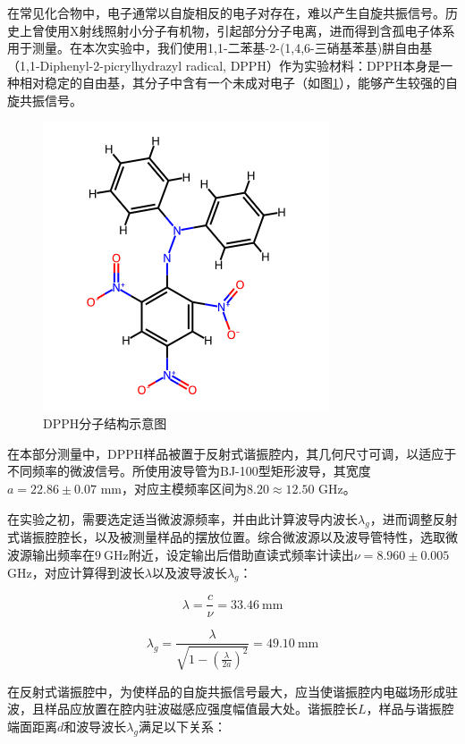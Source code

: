 \documentclass{thuemp}
\begin{document}
    在常见化合物中，电子通常以自旋相反的电子对存在，难以产生自旋共振信号。历史上曾使用X射线照射小分子有机物，引起部分分子电离，进而得到含孤电子体系用于测量。在本次实验中，我们使用1,1-二苯基-2-(1,4,6-三硝基苯基)肼自由基（1,1-Diphenyl-2-picrylhydrazyl radical, DPPH）作为实验材料：DPPH本身是一种相对稳定的自由基，其分子中含有一个未成对电子（如图\ref{fig:DPPH}），能够产生较强的自旋共振信号。\
    
    \begin{figure}[H]
        \centering
        \includegraphics[width=0.5\linewidth]{./DPPH_molecule.png}
        \caption{DPPH分子结构示意图} \label{fig:DPPH}
    \end{figure}
    
    在本部分测量中，DPPH样品被置于反射式谐振腔内，其几何尺寸可调，以适应于不同频率的微波信号。所使用波导管为BJ-100型矩形波导，其宽度$a=22.86\pm0.07$ \si{\milli\meter}，对应主模频率区间为$8.20 \approx 12.50$ \si{\giga\hertz}。
    
    在实验之初，需要选定适当微波源频率，并由此计算波导内波长$\lambda_g$，进而调整反射式谐振腔腔长，以及被测量样品的摆放位置。综合微波源以及波导管特性，选取微波源输出频率在$9~\text{GHz}$附近，设定输出后借助直读式频率计读出$\nu  = 8.960 \pm 0.005$ \si{\giga\hertz}，对应计算得到波长$\lambda$以及波导波长$\lambda_g$：
    
    \begin{equation}
    \lambda = \frac{c}{\nu} = 33.46 ~\text{mm}
    \end{equation}
    
    \begin{equation}
    \lambda_g = \frac{\lambda}{\sqrt{1 - \left(\frac{\lambda}{2a}\right)^2}} = 49.10 ~\text{mm}
    \end{equation}
    
    在反射式谐振腔中，为使样品的自旋共振信号最大，应当使谐振腔内电磁场形成驻波，且样品应放置在腔内驻波磁感应强度幅值最大处。谐振腔长$L$，样品与谐振腔端面距离$d$和波导波长$\lambda_g$满足以下关系：
    
\end{document}
